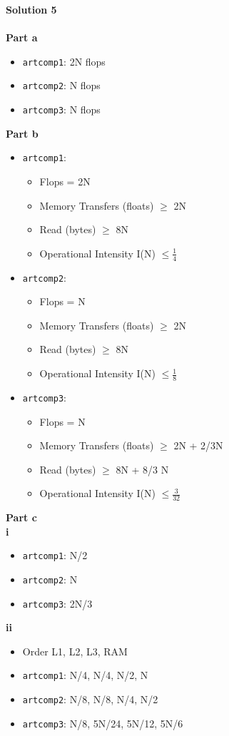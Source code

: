 \documentclass[letterpaper, 11pt]{article}
\begin{document}
\textbf{Solution 5}\\ \\
\textbf{Part a}
\begin{itemize}
\item \texttt{artcomp1}: 2N flops
\item \texttt{artcomp2}: N flops
\item \texttt{artcomp3}: N flops
\end{itemize}
\textbf{Part b}
\begin{itemize}
\item \texttt{artcomp1}: 
\begin{itemize}
\item Flops = 2N
\item Memory Transfers (floats) $\geq$ 2N
\item Read (bytes) $\geq$ 8N
\item Operational Intensity I(N)  $\leq \frac{1}{4}$ 
\end{itemize}
\item \texttt{artcomp2}: 
\begin{itemize}
\item Flops = N
\item Memory Transfers (floats) $\geq$ 2N
\item Read (bytes) $\geq$ 8N
\item Operational Intensity I(N)  $\leq \frac{1}{8}$ 
\end{itemize}
\item \texttt{artcomp3}: 
\begin{itemize}
\item Flops = N
\item Memory Transfers (floats) $\geq$ 2N + 2/3N
\item Read (bytes) $\geq$ 8N + 8/3 N
\item Operational Intensity I(N)  $\leq \frac{3}{32}$ 
\end{itemize}
\end{itemize}
\textbf{Part c} \\
\textbf{i}
\begin{itemize}
\item \texttt{artcomp1}:  N/2
\item \texttt{artcomp2}:  N
\item \texttt{artcomp3}:  2N/3
\end{itemize}
\textbf{ii}
\begin{itemize}
\item Order L1, L2, L3, RAM
\item \texttt{artcomp1}:  N/4, N/4, N/2, N
\item \texttt{artcomp2}:  N/8, N/8, N/4, N/2 
\item \texttt{artcomp3}:  N/8, 5N/24, 5N/12, 5N/6
\end{itemize}
\bigskip

\clearpage

\end{document}
